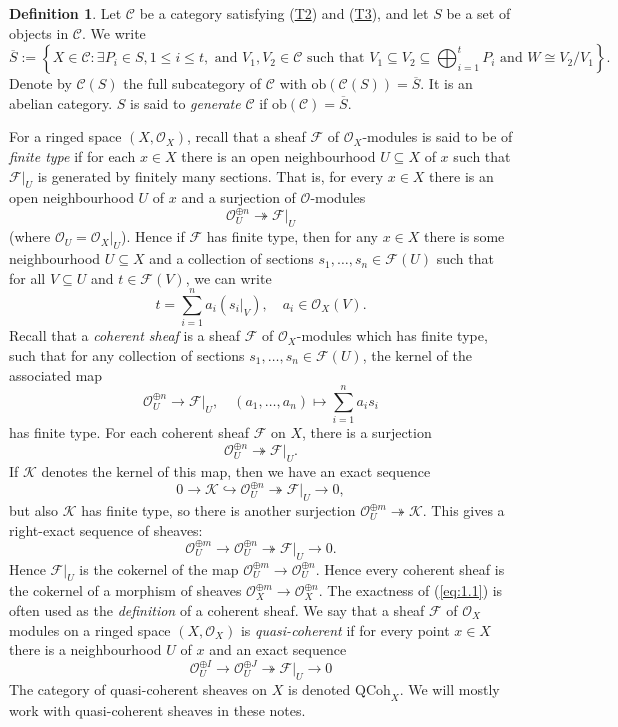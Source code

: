 \documentclass[10pt]{amsart}
\numberwithin{equation}{section}
\def\~#1{\mathscr{#1}}
\newcommand{\epi}{\twoheadrightarrow}
\newcommand{\mono}{\hookrightarrow}
\newcommand{\ob}{\mathrm{ob}}
\newcommand{\QCoh}{\mathrm{QCoh}}
\theoremstyle{plain}
\theoremstyle{definition}
\newtheorem{defn}[thm]{Definition}
\theoremstyle{remark}
\begin{document}
\begin{defn} Let $\~C$ be a category satisfying (\hyperref[T2]{T2}) and (\hyperref[T3]{T3}), and let $S$ be a set of objects in $\~C$. We write
    \[\overline{S} := \left\{X \in \~C: \exists P_i \in S, 1 \le i \le t, \text{ and } V_1, V_2 \in \~C \text{ such that } V_1 \subseteq V_2 \subseteq \bigoplus_{i=1}^t P_i \text{ and } W \cong V_2/V_1 \right\}.\]
Denote by $\~C(S)$ the full subcategory of $\~C$ with $\ob \left(\~C(S)\right) = \overline{S}$. It is an abelian category. $S$ is said to \emph{generate} $\~C$ if $\ob(\~C) = \overline{S}$.
\end{defn}

For a ringed space $(X, \~O_X)$, recall that a sheaf $\~F$ of $\~O_X$-modules is said to be of \emph{finite type} if for each $x \in X$ there is an open neighbourhood $U \subseteq X$ of $x$ such that $\~F|_U$ is generated by finitely many sections. That is, for every $x \in X$ there is an open neighbourhood $U$ of $x$ and a surjection of $\~O$-modules
    \[\~O_U^{\oplus n} \epi \~F|_U\] 
(where $\~O_U = \~O_X|_U$). Hence if $\~F$ has finite type, then for any $x \in X$ there is some neighbourhood $U \subseteq X$ and a collection of sections $s_1, \hdots, s_n \in \~F(U)$ such that for all $V \subseteq U$ and $t \in \~F(V)$, we can write
\[t =\sum_{i = 1}^n a_i \left(s_i|_V\right), \quad a_i \in \~O_X(V).\]
Recall that a \emph{coherent sheaf} is a sheaf $\~F$ of $\~O_X$-modules which has finite type, such that for any collection of sections $s_1, \hdots, s_n \in \~F(U)$, the kernel of the associated map
    \[\~O_U^{\oplus n} \to \~F|_U, \quad (a_1, \hdots, a_n) \mapsto \sum_{i=1}^n a_i s_i\]
has finite type. For each coherent sheaf $\~F$ on $X$, there is a surjection 
\[\~O_U^{\oplus n} \epi \~F|_U.\]
If $\~K$ denotes the kernel of this map, then we have an exact sequence
\[0 \to \~K \mono \~O_U^{\oplus n} \epi \~F|_U \to 0,\]
but also $\~K$ has finite type, so there is another surjection $\~O_U^{\oplus m} \epi \~K$. This gives a right-exact sequence of sheaves:
\begin{equation}\label{eq:1.1}
    \~O_U^{\oplus m} \to \~O_U^{\oplus n} \epi \~F|_U \to 0.
\end{equation}
Hence $\~F|_U$ is the cokernel of the map $\~O_U^{\oplus m} \to \~O_U^{\oplus n}$. Hence every coherent sheaf is the cokernel of a morphism of sheaves $\~O_X^{\oplus m} \to \~O_X^{\oplus n}$. The exactness of (\ref{eq:1.1}) is often used as the \emph{definition} of a coherent sheaf. We say that a sheaf $\~F$ of $\~O_X$ modules on a ringed space $(X, \~O_X)$ is \emph{quasi-coherent} if for every point $x \in X$ there is a neighbourhood $U$ of $x$ and an exact sequence
\begin{equation}\~O^{\oplus I}_U \to \~O^{\oplus J}_U \epi \~F|_U \to 0\end{equation}
The category of quasi-coherent sheaves on $X$ is denoted $\QCoh_X$. We will mostly work with quasi-coherent sheaves in these notes.
\end{document}
